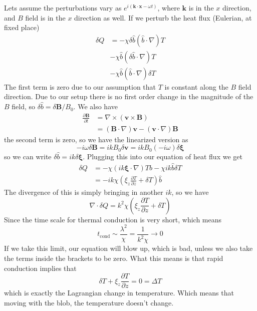 \documentclass[letterpaper, 11pt]{article}
\numberwithin{equation}{section}
\numberwithin{figure}{section}
\begin{document}
Lets assume the perturbations vary as $e^{i(\mathbf{k}\cdot \mathbf{x} - \omega
  t)}$, where $\mathbf{k}$ is in the $x$ direction, and $B$ field is in the $x$
direction as well. If we perturb the heat flux (Eulerian, at fixed place)
\begin{equation}
  \label{eq:30}
  \begin{split}
    \delta Q &= -\chi \delta \hat{b}(\hat{b}\cdot\nabla) T \\
    &-\chi \hat{b}(\delta \hat{b}\cdot\nabla) T \\
    &-\chi \hat{b}(\hat{b}\cdot\nabla) \delta T
  \end{split}
\end{equation}
The first term is zero due to our assumption that $T$ is constant along the $B$
field direction. Due to our setup there is no first order change in the
magnitude of the $B$ field, so $\delta \hat{b} = \delta \mathbf{B} / B_{0}$. We also
have
\begin{equation}
  \label{eq:31}
  \begin{split}
    \frac{\partial \mathbf{B}}{\partial t} &= \nabla\times (\mathbf{v}\times \mathbf{B}) \\
    &= (\mathbf{B}\cdot \nabla)\mathbf{v} - (\mathbf{v}\cdot\nabla)\mathbf{B}
  \end{split}
\end{equation}
the second term is zero, so we have the linearized version as
\begin{equation}
  \label{eq:32}
  -i\omega \delta \mathbf{B} = ik B_0\delta \mathbf{v} = ikB_0(-i\omega)\delta \boldsymbol{\xi}
\end{equation}
so we can write $\delta \hat{b} = ik\delta\boldsymbol{\xi}$. Plugging this into
our equation of heat flux we get
\begin{equation}
  \label{eq:33}
  \begin{split}
    \delta Q &= -\chi (ik\boldsymbol{\xi}\cdot\nabla)T \hat{b} - \chi ik \hat{b} \delta T \\
    &= -ik\chi (\xi_z\frac{\partial T}{\partial z} + \delta T)\hat{b}
  \end{split}
\end{equation}
The divergence of this is simply bringing in another $ik$, so we have
\begin{equation}
  \label{eq:34}
  \nabla\cdot\delta Q = k^2\chi(\xi_z\frac{\partial T}{\partial z} + \delta T)
\end{equation}
Since the time scale for thermal conduction is very short, which means
\begin{equation}
  \label{eq:35}
  t_\mathrm{cond} \sim \frac{\lambda^2}{\chi} = \frac{1}{k^2\chi} \to 0
\end{equation}
If we take this limit, our equation will blow up, which is bad, unless we also
take the terms inside the brackets to be zero. What this means is that rapid
conduction implies that
\begin{equation}
  \label{eq:36}
  \delta T + \xi_{z}\frac{\partial T}{\partial z} = 0 = \Delta T
\end{equation}
which is exactly the Lagrangian change in temperature. Which means that moving
with the blob, the temperature doesn't change.
\end{document}
